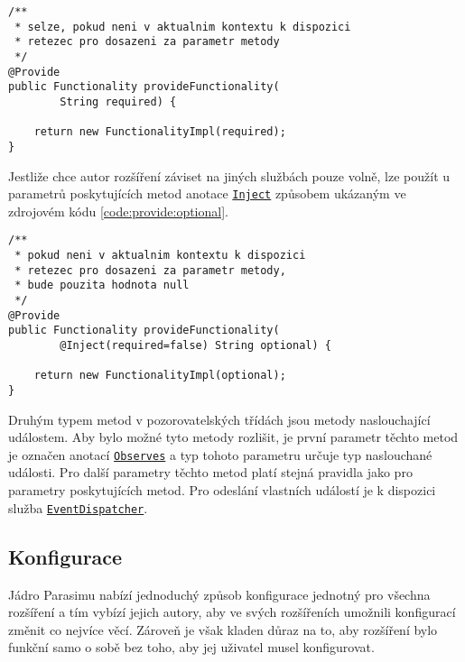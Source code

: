 \begin{lstlisting}[label={code:provide:required}, caption={První metoda poskytující službu \texttt{Functionality}}]
/**
 * selze, pokud neni v aktualnim kontextu k dispozici 
 * retezec pro dosazeni za parametr metody
 */
@Provide
public Functionality provideFunctionality(
		String required) {

	return new FunctionalityImpl(required);
}
\end{lstlisting}

Jestliže chce autor rozšíření záviset na jiných službách pouze volně, lze použít 
u parametrů poskytujících metod anotace \href{https://github.com/sybila/parasim/blob/2.0.0.Final/core/src/main/java/org/sybila/parasim/core/annotation/Inject.java}{\texttt{Inject}} způsobem u\-ká\-za\-ným ve zdrojovém
kódu \ref{code:provide:optional}.

\begin{lstlisting}[label={code:provide:optional}, caption={Druhá metoda poskytující službu \texttt{Functionality}}]
/**
 * pokud neni v aktualnim kontextu k dispozici 
 * retezec pro dosazeni za parametr metody,
 * bude pouzita hodnota null
 */
@Provide
public Functionality provideFunctionality(
		@Inject(required=false) String optional) {

	return new FunctionalityImpl(optional);
}
\end{lstlisting}

Druhým typem metod v pozorovatelských třídách jsou metody na\-slou\-cha\-jí\-cí událostem.
Aby bylo možné tyto metody rozlišit, je první parametr těchto metod je označen anotací \href{https://github.com/sybila/parasim/blob/2.0.0.Final/core/src/main/java/org/sybila/parasim/core/annotation/Observes.java}{\texttt{Observes}}
a typ tohoto parametru určuje typ naslouchané události. Pro další parametry těchto metod platí
stejná pravidla jako pro parametry poskytujících metod. Pro odeslání vlastních událostí
je k dispozici služba \href{https://github.com/sybila/parasim/blob/2.0.0.Final/core/src/main/java/org/sybila/parasim/core/api/EventDispatcher.java}{\texttt{EventDispatcher}}.

\subsection{Konfigurace}

Jádro Parasimu nabízí jednoduchý způsob konfigurace jednotný pro všech\-na rozšíření
a tím vybízí jejich autory, aby ve svých rozšířeních umožnili konfigurací změnit
co nejvíce věcí. Zároveň je však kladen důraz na to, aby rozšíření bylo funkční 
samo o sobě bez toho, aby jej uživatel musel konfigurovat.

